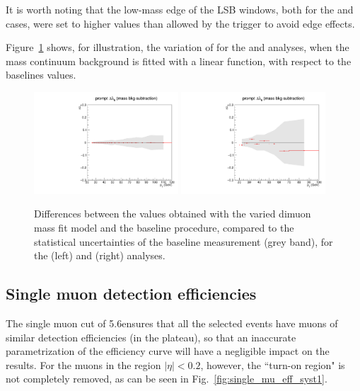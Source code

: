 It is worth noting that the low-mass edge of the LSB windows,
both for the \jpsi and \psip cases, 
were set to higher values than allowed by the trigger to avoid edge effects.

Figure~\ref{fig:mass-fit-syst} shows, for illustration, 
the variation of \lth for the \jpsi and \psip analyses, 
when the mass continuum background is fitted with a linear function, 
with respect to the baselines values.

\begin{figure}[h]
\centering
\includegraphics[width = 0.48\textwidth]{Figures/chapter6/lth_absDiff_M-jpsi.pdf}
\includegraphics[width = 0.48\textwidth]{Figures/chapter6/lth_absDiff_M-psip.pdf}
\caption{Differences between the \lth values obtained with the varied 
dimuon mass fit model and the baseline procedure, 
compared to the statistical uncertainties of the baseline measurement (grey band),
for the \jpsi (left) and \psip (right) analyses.}
\label{fig:mass-fit-syst}
\end{figure}

\vfill\newpage

\subsection{Single muon detection efficiencies}

The single muon \pt cut of 5.6\GeV ensures that 
all the selected events have muons of similar detection efficiencies (in the plateau),
so that an inaccurate parametrization of the efficiency curve will have 
a negligible impact on the results.
For the muons in the region $|\eta| < 0.2$, however, 
the ``turn-on region" is not completely removed,
as can be seen in Fig.~\ref{fig:single_mu_eff_syst1}.


